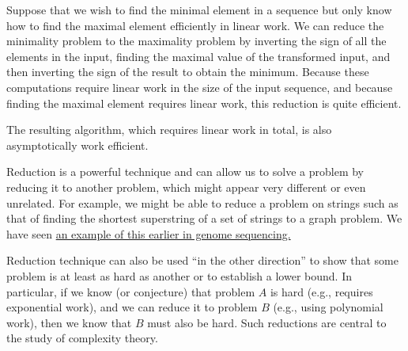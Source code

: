 \begin{cluster}
\label{grp:xmpl:design::basics::reduction-from-minimal-to-maximal}

\begin{example}
\label{xmpl:design::basics::reduction-from-minimal-to-maximal}
Suppose that we wish to find the minimal element in a sequence but
only know how to find the maximal element efficiently in linear work.
We can reduce the minimality problem to the maximality problem by
inverting the sign of all the elements in the input, finding the
maximal value of the transformed input, and then inverting the sign of
the result to obtain the minimum.
Because these computations require linear work in the size of the
input sequence, and because finding the maximal element requires
linear work, this reduction is quite efficient.

The resulting algorithm, which requires linear work in total, is also
asymptotically work efficient.

\end{example}
\end{cluster}

\begin{cluster}
\label{grp:rmrk:design::basics::reduction}

\begin{remark}
\label{rmrk:design::basics::reduction}
Reduction is a powerful technique and can allow us to solve a problem
by reducing it to another problem, which might appear very different
or even unrelated.
For example, we might be able to reduce a problem on strings such as
that of finding the shortest superstring of a set of strings to a
graph problem.
We have seen \href{sec:genome::alg}{an example of this earlier in genome sequencing.}

\end{remark}
\end{cluster}

\begin{cluster}
\label{grp:rmrk:design::basics::proving-hardness-by-reduction}

\begin{remark}
\label{rmrk:design::basics::proving-hardness-by-reduction}
Reduction technique can also be used ``in the other direction'' to
show that some problem is at least as hard as another or to establish
a lower bound.
In particular, if we know (or conjecture) that problem $A$ is hard
(e.g., requires exponential work), and we can reduce it to problem $B$
(e.g., using polynomial work), then we know that $B$ must also be
hard. 
Such reductions are central to the study of complexity theory.

\end{remark}
\end{cluster}


